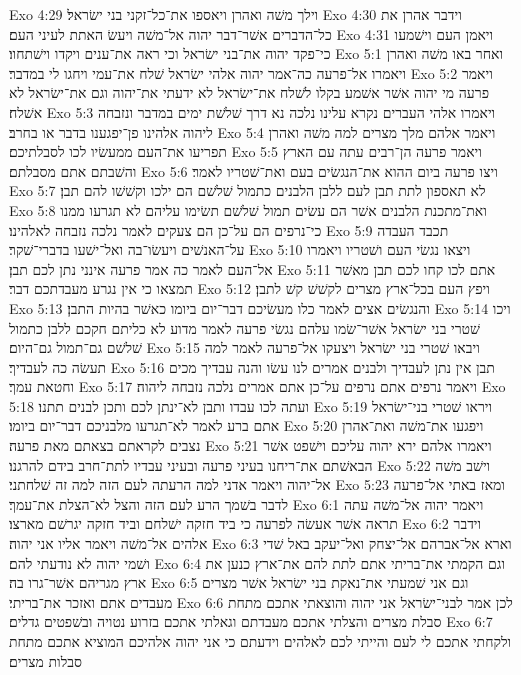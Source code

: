 Exo 4:29  וילך משׁה ואהרן ויאספו את־כל־זקני בני ישׂראל׃
Exo 4:30  וידבר אהרן את כל־הדברים אשׁר־דבר יהוה אל־משׁה ויעשׂ האתת לעיני העם׃
Exo 4:31  ויאמן העם וישׁמעו כי־פקד יהוה את־בני ישׂראל וכי ראה את־ענים ויקדו וישׁתחוו׃
Exo 5:1  ואחר באו משׁה ואהרן ויאמרו אל־פרעה כה־אמר יהוה אלהי ישׂראל שׁלח את־עמי ויחגו לי במדבר׃
Exo 5:2  ויאמר פרעה מי יהוה אשׁר אשׁמע בקלו לשׁלח את־ישׂראל לא ידעתי את־יהוה וגם את־ישׂראל לא אשׁלח׃
Exo 5:3  ויאמרו אלהי העברים נקרא עלינו נלכה נא דרך שׁלשׁת ימים במדבר ונזבחה ליהוה אלהינו פן־יפגענו בדבר או בחרב׃
Exo 5:4  ויאמר אלהם מלך מצרים למה משׁה ואהרן תפריעו את־העם ממעשׂיו לכו לסבלתיכם׃
Exo 5:5  ויאמר פרעה הן־רבים עתה עם הארץ והשׁבתם אתם מסבלתם׃
Exo 5:6  ויצו פרעה ביום ההוא את־הנגשׂים בעם ואת־שׁטריו לאמר׃
Exo 5:7  לא תאספון לתת תבן לעם ללבן הלבנים כתמול שׁלשׁם הם ילכו וקשׁשׁו להם תבן׃
Exo 5:8  ואת־מתכנת הלבנים אשׁר הם עשׂים תמול שׁלשׁם תשׂימו עליהם לא תגרעו ממנו כי־נרפים הם על־כן הם צעקים לאמר נלכה נזבחה לאלהינו׃
Exo 5:9  תכבד העבדה על־האנשׁים ויעשׂו־בה ואל־ישׁעו בדברי־שׁקר׃
Exo 5:10  ויצאו נגשׂי העם ושׁטריו ויאמרו אל־העם לאמר כה אמר פרעה אינני נתן לכם תבן׃
Exo 5:11  אתם לכו קחו לכם תבן מאשׁר תמצאו כי אין נגרע מעבדתכם דבר׃
Exo 5:12  ויפץ העם בכל־ארץ מצרים לקשׁשׁ קשׁ לתבן׃
Exo 5:13  והנגשׂים אצים לאמר כלו מעשׂיכם דבר־יום ביומו כאשׁר בהיות התבן׃
Exo 5:14  ויכו שׁטרי בני ישׂראל אשׁר־שׂמו עלהם נגשׂי פרעה לאמר מדוע לא כליתם חקכם ללבן כתמול שׁלשׁם גם־תמול גם־היום׃
Exo 5:15  ויבאו שׁטרי בני ישׂראל ויצעקו אל־פרעה לאמר למה תעשׂה כה לעבדיך׃
Exo 5:16  תבן אין נתן לעבדיך ולבנים אמרים לנו עשׂו והנה עבדיך מכים וחטאת עמך׃
Exo 5:17  ויאמר נרפים אתם נרפים על־כן אתם אמרים נלכה נזבחה ליהוה׃
Exo 5:18  ועתה לכו עבדו ותבן לא־ינתן לכם ותכן לבנים תתנו׃
Exo 5:19  ויראו שׁטרי בני־ישׂראל אתם ברע לאמר לא־תגרעו מלבניכם דבר־יום ביומו׃
Exo 5:20  ויפגעו את־משׁה ואת־אהרן נצבים לקראתם בצאתם מאת פרעה׃
Exo 5:21  ויאמרו אלהם ירא יהוה עליכם וישׁפט אשׁר הבאשׁתם את־ריחנו בעיני פרעה ובעיני עבדיו לתת־חרב בידם להרגנו׃
Exo 5:22  וישׁב משׁה אל־יהוה ויאמר אדני למה הרעתה לעם הזה למה זה שׁלחתני׃
Exo 5:23  ומאז באתי אל־פרעה לדבר בשׁמך הרע לעם הזה והצל לא־הצלת את־עמך׃
Exo 6:1  ויאמר יהוה אל־משׁה עתה תראה אשׁר אעשׂה לפרעה כי ביד חזקה ישׁלחם וביד חזקה יגרשׁם מארצו׃
Exo 6:2  וידבר אלהים אל־משׁה ויאמר אליו אני יהוה׃
Exo 6:3  וארא אל־אברהם אל־יצחק ואל־יעקב באל שׁדי ושׁמי יהוה לא נודעתי להם׃
Exo 6:4  וגם הקמתי את־בריתי אתם לתת להם את־ארץ כנען את ארץ מגריהם אשׁר־גרו בה׃
Exo 6:5  וגם אני שׁמעתי את־נאקת בני ישׂראל אשׁר מצרים מעבדים אתם ואזכר את־בריתי׃
Exo 6:6  לכן אמר לבני־ישׂראל אני יהוה והוצאתי אתכם מתחת סבלת מצרים והצלתי אתכם מעבדתם וגאלתי אתכם בזרוע נטויה ובשׁפטים גדלים׃
Exo 6:7  ולקחתי אתכם לי לעם והייתי לכם לאלהים וידעתם כי אני יהוה אלהיכם המוציא אתכם מתחת סבלות מצרים׃
